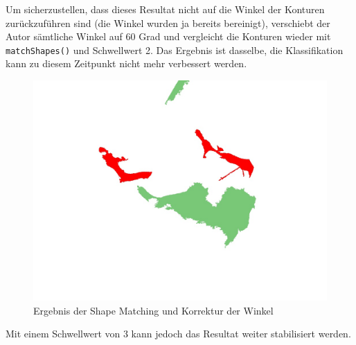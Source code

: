 Um sicherzustellen, dass dieses Resultat nicht auf die Winkel der Konturen zurückzuführen sind (die Winkel wurden ja bereits bereinigt), verschiebt der Autor sämtliche Winkel auf 60 Grad und vergleicht die Konturen wieder mit \texttt{matchShapes()} und Schwellwert 2. Das Ergebnis ist dasselbe, die Klassifikation kann zu diesem Zeitpunkt nicht mehr verbessert werden. 
\begin{figure}[H]
	\center
	\includegraphics[scale=0.43]{Grafiken/entwicklung/30ShapeMatching.jpg}
	\caption{Ergebnis der Shape Matching und Korrektur der Winkel} 
	\label{fig: Ergebnis der Shape Matching und Korrektur der Winkel} 
\end{figure}


Mit einem Schwellwert von 3 kann jedoch das Resultat weiter stabilisiert werden.
